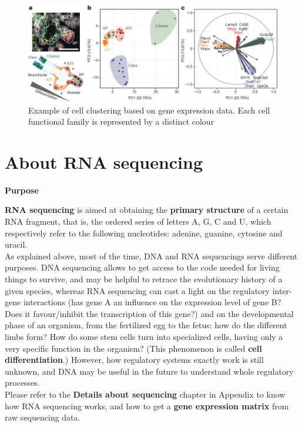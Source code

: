 \documentclass{report}
\begin{document}
\begin{figure}[H]
\centering
\includegraphics[scale=0.45]{illustrations/cellclustering.jpg}
\caption{Example of cell clustering based on gene expression data. Each cell functional family is represented by a distinct colour}
\label{cellclustering}
\end{figure}

\section{About RNA sequencing}

\textbf{Purpose}
\bigskip

\textbf{RNA sequencing} is aimed at obtaining the \textbf{primary structure} of a certain RNA fragment, that is, the ordered series of letters A, G, C and U, which respectively refer to the following nucleotides: adenine, guanine, cytosine and uracil.\\

As explained above, most of the time, DNA and RNA sequencings serve different purposes. DNA sequencing allows to get access to the code needed for living things to survive, and may be helpful to retrace the evolutionary history of a given species, whereas RNA sequencing can cast a light on the regulatory inter-gene interactions (has gene A an influence on the expression level of gene B? Does it favour/inhibit the transcription of this gene?) and on the developmental phase of an organism, from the fertilized egg to the fetus: how do the different limbs form? How do some stem cells turn into specialized cells, having only a very specific function in the organism? (This phenomenon is called \textbf{cell differentiation}.) However, how regulatory systems exactly work is still unknown, and DNA may be useful in the future to understand whole regulatory processes.\\

Please refer to the \textbf{Details about sequencing} chapter in Appendix to know how RNA sequencing works, and how to get a \textbf{gene expression matrix} from raw sequencing data.\\
\end{document}
